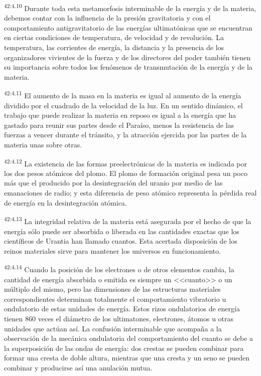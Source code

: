 \par
\textsuperscript{42:4.10} Durante toda esta metamorfosis interminable de la energía y de la materia, debemos contar con la influencia de la presión gravitatoria y con el comportamiento antigravitatorio de las energías ultimatónicas que se encuentran en ciertas condiciones de temperatura, de velocidad y de revolución. La temperatura, las corrientes de energía, la distancia y la presencia de los organizadores vivientes de la fuerza y de los directores del poder también tienen su importancia sobre todos los fenómenos de transmutación de la energía y de la materia.

\par
\textsuperscript{42:4.11} El aumento de la masa en la materia es igual al aumento de la energía dividido por el cuadrado de la velocidad de la luz. En un sentido dinámico, el trabajo que puede realizar la materia en reposo es igual a la energía que ha gastado para reunir sus partes desde el Paraíso, menos la resistencia de las fuerzas a vencer durante el tránsito, y la atracción ejercida por las partes de la materia unas sobre otras.

\par
\textsuperscript{42:4.12} La existencia de las formas preelectrónicas de la materia es indicada por los dos pesos atómicos del plomo. El plomo de formación original pesa un poco más que el producido por la desintegración del uranio por medio de las emanaciones de radio; y esta diferencia de peso atómico representa la pérdida real de energía en la desintegración atómica.

\par
\textsuperscript{42:4.13} La integridad relativa de la materia está asegurada por el hecho de que la energía sólo puede ser absorbida o liberada en las cantidades exactas que los científicos de Urantia han llamado cuantos. Esta acertada disposición de los reinos materiales sirve para mantener los universos en funcionamiento.

\par
\textsuperscript{42:4.14} Cuando la posición de los electrones o de otros elementos cambia, la cantidad de energía absorbida o emitida es siempre un <<cuanto>> o un múltiplo del mismo, pero las dimensiones de las estructuras materiales correspondientes determinan totalmente el comportamiento vibratorio u ondulatorio de estas unidades de energía. Estos rizos ondulatorios de energía tienen 860 veces el diámetro de los ultimatones, electrones, átomos u otras unidades que actúan así. La confusión interminable que acompaña a la observación de la mecánica ondulatoria del comportamiento del cuanto se debe a la superposición de las ondas de energía: dos crestas se pueden combinar para formar una cresta de doble altura, mientras que una cresta y un seno se pueden combinar y producirse así una anulación mutua.

